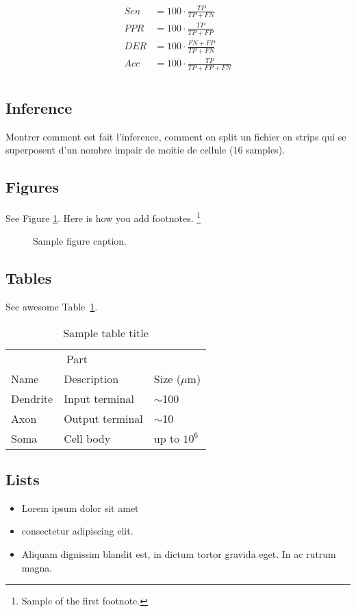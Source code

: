 \documentclass{article}
\begin{document}
\begin{align}
   Sen &= 100 \cdot \frac{TP}{TP+FN}\\
   PPR &= 100 \cdot \frac{TP}{TP+FP}\\
   DER &= 100 \cdot \frac{FN+FP}{TP+FN}\\
   Acc &= 100 \cdot \frac{TP}{TP+FP+FN}\\
\end{align}
\subsection{Inference}
Montrer comment est fait l'inference, comment on split un fichier en strips qui se superposent d'un nombre impair de moitie de cellule (16 samples).


\subsection{Figures}
\lipsum[10] 
See Figure \ref{fig:fig1}. Here is how you add footnotes. \footnote{Sample of the first footnote.}
\lipsum[11] 

\begin{figure}
  \centering
  \fbox{\rule[-.5cm]{4cm}{4cm} \rule[-.5cm]{4cm}{0cm}}
  \caption{Sample figure caption.}
  \label{fig:fig1}
\end{figure}

\subsection{Tables}
\lipsum[12]
See awesome Table~\ref{tab:table}.

\begin{table}
 \caption{Sample table title}
  \centering
  \begin{tabular}{lll}
    \toprule
    \multicolumn{2}{c}{Part}                   \\
    \cmidrule(r){1-2}
    Name     & Description     & Size ($\mu$m) \\
    \midrule
    Dendrite & Input terminal  & $\sim$100     \\
    Axon     & Output terminal & $\sim$10      \\
    Soma     & Cell body       & up to $10^6$  \\
    \bottomrule
  \end{tabular}
  \label{tab:table}
\end{table}

\subsection{Lists}
\begin{itemize}
\item Lorem ipsum dolor sit amet
\item consectetur adipiscing elit. 
\item Aliquam dignissim blandit est, in dictum tortor gravida eget. In ac rutrum magna.
\end{itemize}





\end{document}
